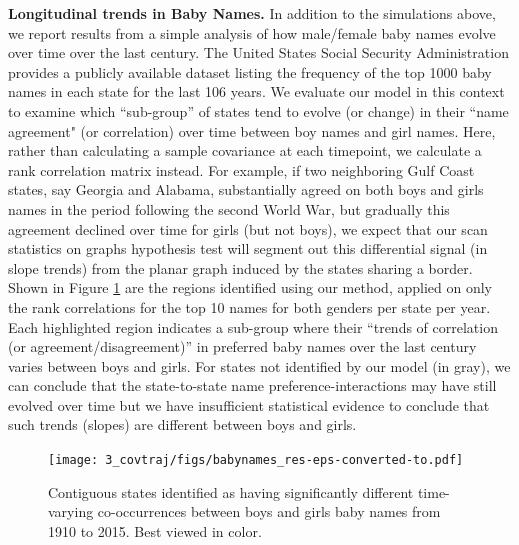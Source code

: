 {\bf Longitudinal trends in Baby Names.} In addition to the simulations above, we report results from a simple analysis of 
how male/female baby names evolve over time over the last century. 
The United States Social Security Administration provides a publicly available dataset listing the frequency of the 
top 1000 baby names in each state for the last 106 years.
We evaluate our model in this context to examine which ``sub-group'' of states tend to evolve (or change) in their
``name agreement" (or correlation) over time between boy names and girl names.
Here, rather than calculating a sample covariance
at each timepoint, we calculate a rank correlation matrix instead. 
For example, if two neighboring Gulf Coast states, say Georgia and Alabama, substantially 
agreed on both boys and girls names in the period following the second World War, but gradually this agreement 
declined over time for girls (but not boys), 
we expect that our scan statistics on graphs hypothesis test 
will segment out this differential signal (in slope trends) from the planar graph induced by the states sharing 
a border.
Shown in Figure \ref{fig:usmap} are the regions identified using our method, applied on only the rank correlations for the top 10 names for both genders per state per year. Each highlighted region indicates a sub-group
where their ``trends of correlation (or agreement/disagreement)'' in preferred baby names over the last century 
varies between boys and girls. 
For states not identified by our model (in gray), we can conclude that
the state-to-state name preference-interactions may have still 
evolved over time but we have insufficient statistical 
evidence to conclude that such trends (slopes) are different between boys and girls. 

\begin{figure}[]
	\begin{center}
		\texttt{[image: 3\_covtraj/figs/babynames\_res-eps-converted-to.pdf]}
		\caption[Covariance trajectory difference testing results on baby name frequency in the contiguous United States.]{\label{fig:usmap} Contiguous states identified as having significantly different time-varying co-occurrences between boys and girls baby names from 1910 to 2015. Best viewed in color.}
	\end{center}
\end{figure}

